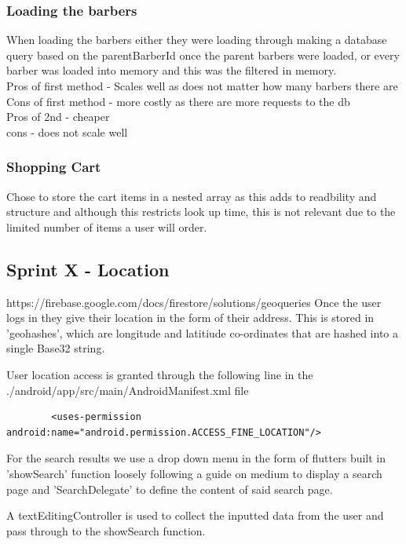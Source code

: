 \documentclass[12pt]{article}
\begin{document}
	\subsubsection{Loading the barbers}
	When loading the barbers either they were loading through making a database query based on the parentBarberId once the parent barbers were loaded, or every barber was loaded into memory and this was the filtered in memory.
	\\
	Pros of first method - Scales well as does not matter how many barbers there are
	\\
	Cons of first method - more costly as there are more requests to the db
	\\
	Pros of 2nd - cheaper
	\\
	cons - does not scale well
	
	\subsubsection{Shopping Cart}
	Chose to store the cart items in a nested array as this adds to readbility and structure and although this restricts look up time, this is not relevant due to the limited number of items a user will order.
	
	\subsection{Sprint X - Location}
	https://firebase.google.com/docs/firestore/solutions/geoqueries
	Once the user logs in they give their location in the form of their address. This is stored in 'geohashes', which are longitude and latitiude co-ordinates that are hashed into a single Base32 string.
	
	User location access is granted through the following line in the ./android/app/src/main/AndroidManifest.xml file
	\begin{lstlisting}
		<uses-permission android:name="android.permission.ACCESS_FINE_LOCATION"/>
	\end{lstlisting}
	For the search results we use a drop down menu in the form of flutters built in 'showSearch' function loosely following a guide on medium \cite{medium-comerge} to display a search page and 'SearchDelegate' to define the content of said search page.
	
	A textEditingController is used to collect the inputted data from the user and pass through to the showSearch function.
	
\end{document}
